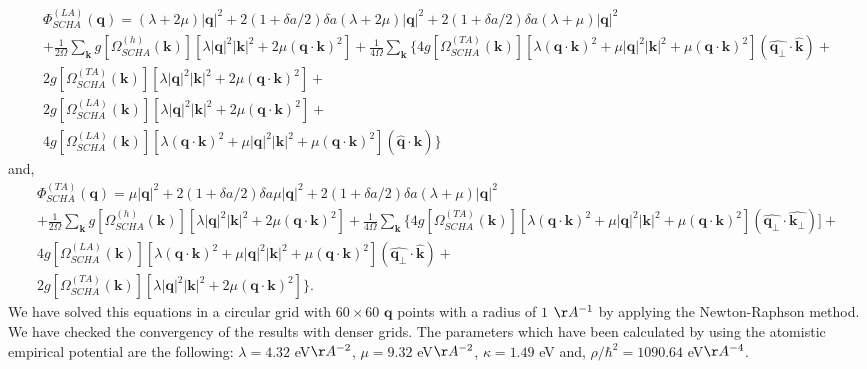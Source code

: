 \begin{multline}
 \Phi_{SCHA}^{(LA)}(\boldsymbol{q})=(\lambda+2\mu)|\boldsymbol{q}|^{2}+2(1+\delta a/2)\delta a(\lambda+2\mu)|\boldsymbol{q}|^{2}+2(1+\delta a/2)\delta a(\lambda+\mu)|\boldsymbol{q}|^{2}\\+\frac{1}{2\Omega}\sum_{\boldsymbol{k}}g[\Omega_{SCHA}^{
 (h)}(\boldsymbol{k})][\lambda|\boldsymbol{q}|^{2}|\boldsymbol{k}|^{2}+2\mu(\boldsymbol{q}\cdot\boldsymbol{k})^{2}]+\frac{1}{4\Omega}\sum_{\boldsymbol{k}}\{4g[\Omega_{SCHA}^{(TA)}(\boldsymbol{k})][\lambda(\boldsymbol{q}\cdot\boldsymbol{
 k})^{2}+\mu|\boldsymbol{q}|^{2}|\boldsymbol{k}|^{2}+\mu(\boldsymbol{q}\cdot\boldsymbol{k})^{2}](\hat{\boldsymbol{q}_{\perp}}\cdot\hat{\boldsymbol{k}})+ \\ 2g[\Omega_{SCHA}^{(TA)}(\boldsymbol{k})][\lambda|\boldsymbol{q}|^{2}|\boldsymbol{
 k}|^{2}+2\mu(\boldsymbol{q}\cdot\boldsymbol{k})^{2}]+ \\ 2g[\Omega_{SCHA}^{(LA)}(\boldsymbol{k})][\lambda|\boldsymbol{q}|^{2}|\boldsymbol{k}|^{2}+2\mu(\boldsymbol{q}\cdot\boldsymbol{k})^{2}]+ \\ 4g[\Omega_{SCHA}^{(LA)}(\boldsymbol{
 k})][\lambda(\boldsymbol{q}\cdot\boldsymbol{k})^{2}+\mu|\boldsymbol{q}|^{2}|\boldsymbol{k}|^{2}+\mu(\boldsymbol{q}\cdot\boldsymbol{k})^{2}](\hat{\boldsymbol{q}}\cdot\hat{\boldsymbol{k}})\}
\end{multline}
and,
\begin{multline}
 \Phi_{SCHA}^{(TA)}(\boldsymbol{q})=\mu|\boldsymbol{q}|^{2}+2(1+\delta a/2)\delta a\mu|\boldsymbol{q}|^{2}+2(1+\delta a/2)\delta a(\lambda+\mu)|\boldsymbol{q}|^{2}\\+\frac{1}{2\Omega}\sum_{\boldsymbol{k}}g[\Omega_{SCHA}^{
 (h)}(\boldsymbol{k})][\lambda|\boldsymbol{q}|^{2}|\boldsymbol{k}|^{2}+2\mu(\boldsymbol{q}\cdot\boldsymbol{k})^{2}]+\frac{1}{4\Omega}\sum_{\boldsymbol{k}}\{
 4g[\Omega_{SCHA}^{(TA)}(\boldsymbol{k})][\lambda(\boldsymbol{q}\cdot\boldsymbol{k})^{2}+\mu|\boldsymbol{q}|^{2}|\boldsymbol{k}|^{2}+\mu(\boldsymbol{q}\cdot\boldsymbol{k})^{2}](\hat{\boldsymbol{q}_{\perp}}\cdot\hat{
 \boldsymbol{k}_{\perp}})]+\\4g[\Omega_{SCHA}^{(LA)}(\boldsymbol{k})][\lambda(\boldsymbol{q}\cdot\boldsymbol{k})^{2}+\mu|\boldsymbol{q}|^{2}|\boldsymbol{k}|^{2}+\mu(\boldsymbol{q}\cdot\boldsymbol{k})^{2}](\hat{\boldsymbol{
 q}_{\perp}}\cdot\hat{\boldsymbol{k}})+ \\ 2g[\Omega_{SCHA}^{(TA)}(\boldsymbol{k})][\lambda|\boldsymbol{q}|^{2}|\boldsymbol{k}|^{2}+2\mu(\boldsymbol{q}\cdot\boldsymbol{k})^{2}]  \}.
\end{multline}
We have solved this equations in a circular grid with $60\times60$ $\boldsymbol{q}$ points with a radius of $1$ 
$\AA^{-1}$ by applying the Newton-Raphson method. We have checked the convergency of the results with denser grids. 
The parameters which have been calculated by using the atomistic empirical potential are the following: 
$\lambda=4.32$ eV$\AA^{-2}$, $\mu=9.32$ eV$\AA^{-2}$, $\kappa=1.49$ eV and, $\rho/\hbar^{2}=1090.64$ eV$\AA^{-4}$. \\

